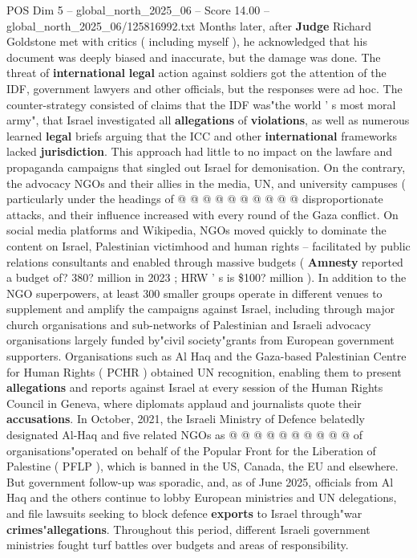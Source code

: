 \begin{textsample}{POS Dim 5 – global\_north\_2025\_06 – Score 14.00 – global\_north\_2025\_06/125816992.txt}
Months later, after \textbf{Judge} Richard Goldstone met with critics ( including myself ), he acknowledged that his document was deeply biased and inaccurate, but the damage was done.
The threat of \textbf{international} \textbf{legal} action against soldiers got the attention of the IDF, government lawyers and other officials, but the responses were ad hoc.
The counter-strategy consisted of claims that the IDF was"the world ' s most moral army", that Israel investigated all \textbf{allegations} of \textbf{violations}, as well as numerous learned \textbf{legal} briefs arguing that the ICC and other \textbf{international} frameworks lacked \textbf{jurisdiction}.
This approach had little to no impact on the lawfare and propaganda campaigns that singled out Israel for demonisation.
On the contrary, the advocacy NGOs and their allies in the media, UN, and university campuses ( particularly under the headings of @ @ @ @ @ @ @ @ @ @ disproportionate attacks, and their influence increased with every round of the Gaza conflict.
On social media platforms and Wikipedia, NGOs moved quickly to dominate the content on Israel, Palestinian victimhood and human rights -- facilitated by public relations consultants and enabled through massive budgets ( \textbf{Amnesty} reported a budget of? 380? million in 2023 ; HRW ' s is \$100? million ).
In addition to the NGO superpowers, at least 300 smaller groups operate in different venues to supplement and amplify the campaigns against Israel, including through major church organisations and sub-networks of Palestinian and Israeli advocacy organisations largely funded by"civil society"grants from European government supporters.
Organisations such as Al Haq and the Gaza-based Palestinian Centre for Human Rights ( PCHR ) obtained UN recognition, enabling them to present \textbf{allegations} and reports against Israel at every session of the Human Rights Council in Geneva, where diplomats applaud and journalists quote their \textbf{accusations}.
In October, 2021, the Israeli Ministry of Defence belatedly designated Al-Haq and five related NGOs as @ @ @ @ @ @ @ @ @ @ of organisations"operated on behalf of the Popular Front for the Liberation of Palestine ( PFLP ), which is banned in the US, Canada, the EU and elsewhere.
But government follow-up was sporadic, and, as of June 2025, officials from Al Haq and the others continue to lobby European ministries and UN delegations, and file lawsuits seeking to block defence \textbf{exports} to Israel through"war \textbf{crimes}"\textbf{allegations}.
Throughout this period, different Israeli government ministries fought turf battles over budgets and areas of responsibility.

\end{textsample}
